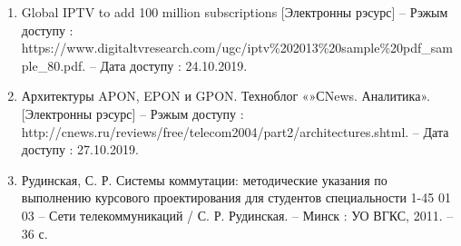 \begin{enumerate}[{label=\arabic{*}}]
          [Электронны рэсурс] --
          Рэжым доступу : http://mediasat.info/2016/05/10/iptv-130-mln-subscribers/
          Дата доступу : 24.10.2019.
          \label{stat: IPTV-world-2016}
    \item Global IPTV to add 100 million subscriptions
          [Электронны рэсурс] --
          Рэжым доступу : https://www.digitaltvresearch.com/ugc/iptv\%202013\%20sample\%20pdf\_sample\_80.pdf. --
          Дата доступу : 24.10.2019.
          \label{stat: IPTV-world-2018}
    \item Архитектуры APON, EPON и GPON. Техноблог «»СNews. Аналитика».
          [Электронны рэсурс] --
          Рэжым доступу :
          http://cnews.ru/reviews/free/telecom2004/part2/architectures.shtml. --
          Дата доступу : 27.10.2019.

          \label{copy-past: 5}
    \item Рудинская, С. Р. Системы коммутации:
          методические указания по выполнению курсового проектирования
          для студентов специальности 1-45 01 03 --
          Сети телекоммуникаций / С. Р. Рудинская. -- Минск : УО ВГКС,
          2011. -- 36 с.
          \label{book:Methodical Book}
\end{enumerate}
